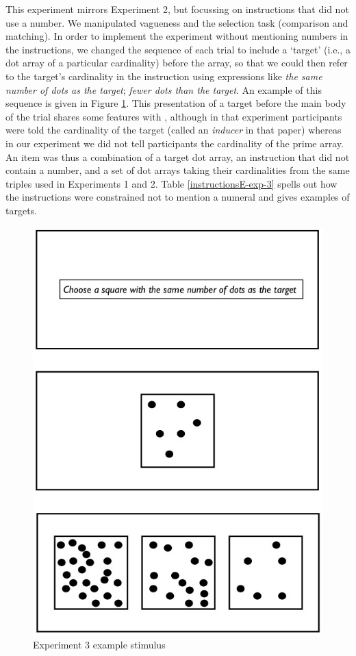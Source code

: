 
This experiment mirrors Experiment 2, but focussing on instructions that did not use a number. We manipulated vagueness and the selection task (comparison and matching). In order to implement the experiment without mentioning numbers in the instructions, we changed the sequence of each trial to include a `target' (i.e., a dot array of a particular cardinality) before the array, so that we could then refer to the target's cardinality in the instruction using expressions like \emph{the same number of dots as the target}; \emph{fewer dots than the target}. An example of this sequence is given in Figure \ref{Experiment3examplestimulus}. This presentation of a target before the main body of the trial shares some features with \citeauthor[Experiment 2]{Izard20081221}, although in that experiment participants were told the cardinality of the target (called an \emph{inducer} in that paper) whereas in our experiment we did not tell participants the cardinality of the prime array. An item was thus a combination of a target dot array, an instruction that did not contain a number, and a set of dot arrays taking their cardinalities from the same triples used in Experiments 1 and 2. Table \ref{instructionsE-exp-3} spells out how the instructions were constrained not to mention a numeral and gives examples of targets.

\begin{figure}[htbp]
\centering
\includegraphics[width=.5\textwidth]{figures/Ee3-flow.jpg}
\caption{Experiment 3 example stimulus}
\label{Experiment3examplestimulus}
\end{figure}

